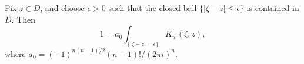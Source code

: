 
Fix $z \in D$, and choose $\epsilon > 0$ such that the closed ball $\{|\zeta - z| \leq \epsilon\}$ is contained in $D$. Then
$$1 = a_0 \int_{\{|\zeta - z| = \epsilon\}} K_w(\zeta, z),$$
where $a_0 = (-1)^{n(n-1)/2}(n-1)!/(2\pi i)^n$.
